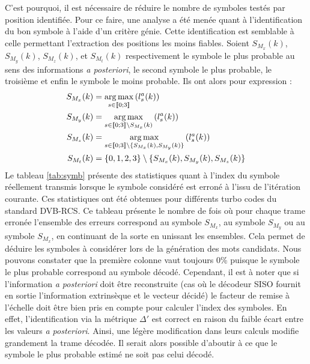C'est pourquoi, il est nécessaire de réduire le nombre de symboles testés par position identifiée. Pour ce faire, une 
analyse a été menée quant à l'identification du bon symbole à l'aide d'un critère génie. Cette identification est semblable 
à celle permettant l'extraction des positions les moins fiables.
Soient $S_{M_x}(k)$, $S_{M_y}(k)$, $S_{M_z}(k)$, et $S_{M_t}(k)$ respectivement le symbole le plus probable au sens 
des informations \textit{a posteriori}, le second symbole le plus probable, le troisième et enfin le symbole le moins 
probable. Ils ont alors pour expression :
\begin{align*}
S_{M_x}(k) &= \operatorname*{arg\,max}\limits_{s\in\llbracket0;3\rrbracket}\left(l^a_s(k)\right) \\
S_{M_y}(k) &= \operatorname*{arg\,max}\limits_{s\in\llbracket0;3\rrbracket\setminus{S_{M_x}(k)}}\left(l^a_s(k)\right)\\
S_{M_z}(k) &= \operatorname*{arg\,max}\limits_{s\in\llbracket0;3\rrbracket\setminus{\{S_{M_x}(k)}, S_{M_y}(k)\}}\left(l^a_s(k)\right)\\
S_{M_t}(k) &= \{0,1,2,3\}\setminus{\{S_{M_x}(k), S_{M_y}(k), S_{M_z}(k)\}}
\end{align*}
Le tableau \ref{tab:symb} présente des statistiques quant à l'index du symbole réellement transmis lorsque le symbole 
considéré est erroné à l'issu de l'itération courante. Ces statistiques ont été obtenues pour différents turbo
codes du standard DVB-RCS. Ce tableau présente le nombre de fois où pour chaque trame erronée l'ensemble des erreurs 
correspond au symbole $S_{M_x}$, au symbole $S_{M_y}$ ou au symbole $S_{M_x}$, en continuant de la sorte en 
unissant les ensembles. Cela permet de déduire les symboles à considérer lors de la génération des 
mots candidats. Nous pouvons constater que la première colonne vaut toujours 0\% puisque le symbole le plus probable correspond au
symbole décodé. Cependant, il est à noter que si l'information \textit{a posteriori} doit être reconstruite (cas où le 
décodeur SISO fournit en sortie l'information extrinsèque et le vecteur décidé) le facteur de remise à l'échelle doit 
être bien pris en compte pour calculer l'index des symboles. En effet, l'identification via la métrique $\Delta'$ est correct
en raison du faible écart entre les valeurs \textit{a posteriori}. Ainsi, une légère modification dans leurs calculs 
modifie grandement la trame décodée. Il serait alors possible d'aboutir à ce que le symbole le plus probable estimé ne
soit pas celui décodé.
